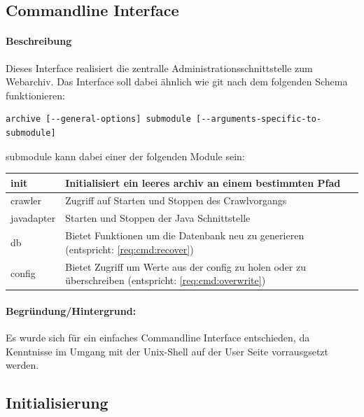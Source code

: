 

\subsection{Commandline Interface}
\label{sub:commandline_interface}
\paragraph{Beschreibung}
\label{par:beschreibung}
Dieses Interface realisiert die zentralle Administrationsschnittstelle zum Webarchiv. 
Das Interface soll dabei ähnlich wie git nach dem folgenden Schema funktionieren:
\begin{verbatim}
archive [--general-options] submodule [--arguments-specific-to-submodule]
\end{verbatim}
submodule kann dabei einer der folgenden Module sein:
\begin{table}[h]
\centering
\begin{tabular}{|l|l|}
    \hline
        init & Initialisiert ein leeres archiv an einem bestimmten Pfad \\
    \hline
        crawler & Zugriff auf Starten und Stoppen des Crawlvorgangs \\
    \hline
        javadapter & Starten und Stoppen der Java Schnittstelle \\
    \hline
    db & Bietet Funktionen um die Datenbank neu zu generieren
    (entspricht: \ref{req:cmd:recover}) \\
    \hline
        config & Bietet Zugriff um Werte aus der config zu holen oder zu überschreiben
        (entspricht: \ref{req:cmd:overwrite}) \\
    \hline
\end{tabular}
\end{table}

\paragraph{Begründung/Hintergrund:}
\label{par:begr_ndung_}
Es wurde sich für ein einfaches Commandline Interface entschieden, da
Kenntnisse im Umgang mit der Unix-Shell auf der User Seite vorrausgsetzt
werden.


\subsection{Initialisierung} 
\label{sub:initialisierung}
